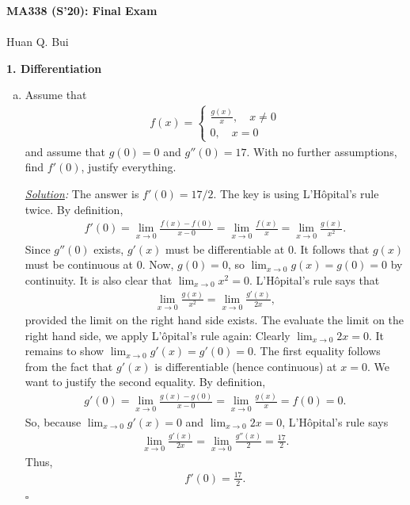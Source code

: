 \documentclass[11pt]{article}
\newcommand{\f}[2]{\frac{#1}{#2}}
\begin{document}
\begin{center}
{\Large\bf  MA338 (S'20): Final Exam}\\
$\,$\\
{\Large  Huan Q. Bui}
\end{center}





\noindent \textbf{1. Differentiation}
\begin{enumerate}[(a)]
	\item Assume that 
	\begin{align*}
	f(x) = \begin{cases}
	\frac{g(x)}{x}, \quad x\neq 0\\
	0, \quad x=0
	\end{cases}
	\end{align*}
	and assume that $g(0) = 0$ and $g''(0) = 17$. With no further assumptions, find $f'(0)$, justify everything.
	
	\noindent \textit{\underline{Solution}:} The answer is $\boxed{f'(0) = 17/2}$. The key is using L'H\^{o}pital's rule twice. By definition, 
	\begin{align*}
	f'(0) = \lim_{x\to 0} \frac{f(x) - f(0)}{x-0} = \lim_{x\to 0}\frac{f(x)}{x} = \lim_{x\to 0}\frac{g(x)}{x^2}. 
	\end{align*}  
	Since $g''(0)$ exists, $g'(x)$ must be differentiable at $0$. It follows that $g(x)$ must be continuous at $0$. Now, $g(0)=0$, so $\lim_{x\to 0} g(x) = g(0) = 0$ by continuity. It is also clear that $\lim_{x\to 0} x^2 = 0$. L'H\^{o}pital's rule says that 
	\begin{align*}
	\lim_{x\to 0}\f{g(x)}{x^2} = \lim_{x\to 0}\f{g'(x)}{2x}, 
	\end{align*} 
	provided the limit on the right hand side exists. The evaluate the limit on the right hand side, we apply L'\^{o}pital's rule again: Clearly $\lim_{x\to 0}2x = 0$. It remains to show $\lim_{x\to 0}g'(x) = g'(0) =0$. The first equality follows from the fact that $g'(x)$ is differentiable (hence continuous) at $x=0$. We want to justify the second equality. By definition,
	\begin{align*}
	g'(0) = \lim_{x\to 0}\f{g(x)  -g(0)}{x-0} = \lim_{x\to 0}\f{g(x)}{x} = f(0) = 0.
	\end{align*} 
	So, because $\lim_{x\to 0}g'(x) = 0$ and $\lim_{x\to 0}2x =0$, L'H\^{o}pital's rule says 
	\begin{align*}
	\lim_{x\to 0}\f{g'(x)}{2x} = \lim_{x\to 0}\f{g''(x)}{2} = \f{17}{2}.
	\end{align*}
	Thus, 
	\begin{align*}
	f'(0) = \f{17}{2}.
	\end{align*}
	\hfill $\square$
	

\end{enumerate}
\end{document}
